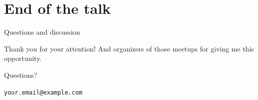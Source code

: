\documentclass[aspectratio=169]{beamer}
\begin{document}


\section{End of the talk}

\begin{frame}{Questions and discussion}
    \begin{center}
        \Large Thank you for your attention! And organizers of those meetups for giving me this opportunity.

        \vspace{1cm}

        Questions?

        \vspace{1cm}

        \texttt{your.email@example.com}

    \end{center}

\end{frame}
\end{document}

